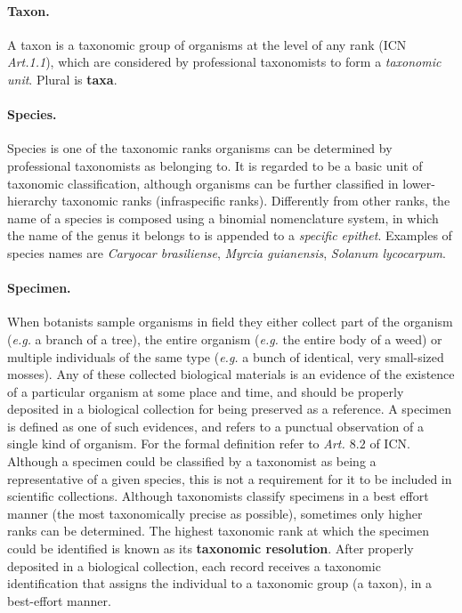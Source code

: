 \paragraph*{Taxon.}
A taxon is a taxonomic group of organisms at the level of any rank (ICN \textit{Art.1.1}), which are considered by professional taxonomists to form a \textit{taxonomic unit}. Plural is \textbf{taxa}.

\paragraph*{Species.}
Species is one of the taxonomic ranks organisms can be determined by professional taxonomists as belonging to. It is regarded to be a basic unit of taxonomic classification, although organisms can be further classified in lower-hierarchy taxonomic ranks (infraspecific ranks).
Differently from other ranks, the name of a species is composed using a binomial nomenclature system, in which the name of the genus it belongs to is appended to a \textit{specific epithet}.
Examples of species names are \textit{Caryocar brasiliense}, \textit{Myrcia guianensis}, \textit{Solanum lycocarpum}.

\paragraph*{Specimen.}
When botanists sample organisms in field they either collect part of the organism (\textit{e.g.} a branch of a tree), the entire organism (\textit{e.g.} the entire body of a weed) or multiple individuals of the same type (\textit{e.g.} a bunch of identical, very small-sized mosses). 
Any of these collected biological materials is an evidence of the existence of a particular organism at some place and time, and should be properly deposited in a biological collection for being preserved as a reference. 
A specimen is defined as one of such evidences, and refers to a punctual observation of a single kind of organism. 
For the formal definition refer to \textit{Art. $8.2$} of ICN. 
Although a specimen could be classified by a taxonomist as being a representative of a given species, this is not a requirement for it to be included in scientific collections. Although taxonomists classify specimens in a best effort manner (the most taxonomically precise as possible), sometimes only higher ranks can be determined. The highest taxonomic rank at which the specimen could be identified is known as its \textbf{taxonomic resolution}.
After properly deposited in a biological collection, each record receives a taxonomic identification that assigns the individual to a taxonomic group (a taxon), in a best-effort manner.







